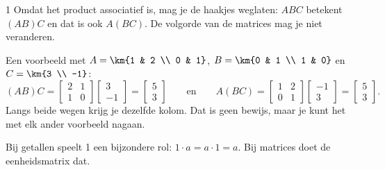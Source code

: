 \begin{alleenvoor}{1}
Omdat het product associatief is, mag je de haakjes weglaten: $ABC$ betekent $(AB)C$ en dat is ook $A(BC)$. De volgorde van de matrices mag je niet veranderen.

Een voorbeeld met $A = \km{1 & 2 \\ 0 & 1}$, $B = \km{0 & 1 \\ 1 & 0}$ en $C = \km{3 \\ -1}$:
\[ (AB)C = \begin{bmatrix} 2 & 1 \\ 1 & 0 \end{bmatrix} \begin{bmatrix} 3 \\ -1 \end{bmatrix} = \begin{bmatrix} 5 \\ 3 \end{bmatrix} \qquad\text{en}\qquad A(BC) = \begin{bmatrix} 1 & 2 \\ 0 & 1 \end{bmatrix} \begin{bmatrix} -1 \\ 3 \end{bmatrix} = \begin{bmatrix} 5 \\ 3 \end{bmatrix} . \]
Langs beide wegen krijg je dezelfde kolom. Dat is geen bewijs, maar je kunt het met elk ander voorbeeld nagaan.
\end{alleenvoor}

Bij getallen speelt 1 een bijzondere rol: $1 \cdot a = a \cdot 1 = a$. Bij matrices doet de eenheidsmatrix dat.

